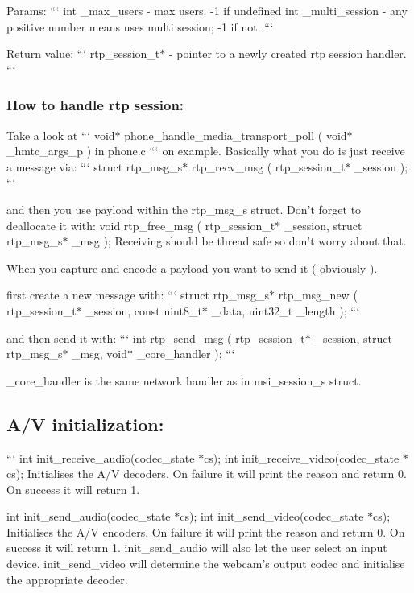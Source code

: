 Params\+: ``` int \+\_\+max\+\_\+users -\/ max users. -\/1 if undefined int \+\_\+multi\+\_\+session -\/ any positive number means uses multi session; -\/1 if not. ```

Return value\+: ``` rtp\+\_\+session\+\_\+t$\ast$ -\/ pointer to a newly created rtp session handler. ```

\subsubsection*{How to handle rtp session\+:}

Take a look at ``` void$\ast$ phone\+\_\+handle\+\_\+media\+\_\+transport\+\_\+poll ( void$\ast$ \+\_\+hmtc\+\_\+args\+\_\+p ) in phone.\+c ``` on example. Basically what you do is just receive a message via\+: ``` struct rtp\+\_\+msg\+\_\+s$\ast$ rtp\+\_\+recv\+\_\+msg ( rtp\+\_\+session\+\_\+t$\ast$ \+\_\+session ); ```

and then you use payload within the rtp\+\_\+msg\+\_\+s struct. Don't forget to deallocate it with\+: void rtp\+\_\+free\+\_\+msg ( rtp\+\_\+session\+\_\+t$\ast$ \+\_\+session, struct rtp\+\_\+msg\+\_\+s$\ast$ \+\_\+msg ); Receiving should be thread safe so don't worry about that.

When you capture and encode a payload you want to send it ( obviously ).

first create a new message with\+: ``` struct rtp\+\_\+msg\+\_\+s$\ast$ rtp\+\_\+msg\+\_\+new ( rtp\+\_\+session\+\_\+t$\ast$ \+\_\+session, const uint8\+\_\+t$\ast$ \+\_\+data, uint32\+\_\+t \+\_\+length ); ```

and then send it with\+: ``` int rtp\+\_\+send\+\_\+msg ( rtp\+\_\+session\+\_\+t$\ast$ \+\_\+session, struct rtp\+\_\+msg\+\_\+s$\ast$ \+\_\+msg, void$\ast$ \+\_\+core\+\_\+handler ); ```

\+\_\+core\+\_\+handler is the same network handler as in msi\+\_\+session\+\_\+s struct.

\subsection*{A/\+V initialization\+:}

``` int init\+\_\+receive\+\_\+audio(codec\+\_\+state $\ast$cs); int init\+\_\+receive\+\_\+video(codec\+\_\+state $\ast$cs); Initialises the A/\+V decoders. On failure it will print the reason and return 0. On success it will return 1.

int init\+\_\+send\+\_\+audio(codec\+\_\+state $\ast$cs); int init\+\_\+send\+\_\+video(codec\+\_\+state $\ast$cs); Initialises the A/\+V encoders. On failure it will print the reason and return 0. On success it will return 1. init\+\_\+send\+\_\+audio will also let the user select an input device. init\+\_\+send\+\_\+video will determine the webcam's output codec and initialise the appropriate decoder.

